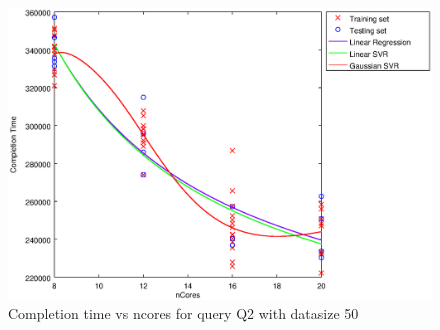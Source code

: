 
\begin {figure}[hbtp]
\centering
\includegraphics[width=\textwidth]{output/Q2_50_ONLY_1_OVER_NCORES/plot_Q2_50_bestmodels.eps}
\caption{Completion time vs ncores for query Q2 with datasize 50}
\label{fig:all_linear_Q2_50}
\end {figure}
